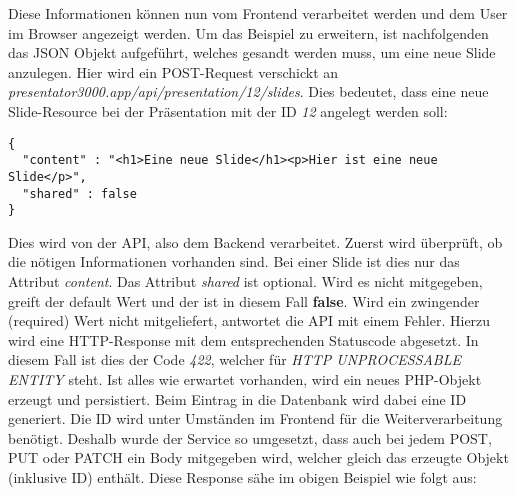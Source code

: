 Diese Informationen können nun vom Frontend verarbeitet werden und dem User im Browser angezeigt werden. Um das Beispiel zu erweitern, ist nachfolgenden das JSON Objekt aufgeführt, welches gesandt werden muss, um eine neue Slide anzulegen. Hier wird ein POST-Request verschickt an \emph{presentator3000.app/api/presentation/12/slides}. Dies bedeutet, dass eine neue Slide-Resource bei der Präsentation mit der ID \emph{12} angelegt werden soll:

\begin{lstlisting}[caption=POST Request um eine neue Slide anzulegen]
{
  "content" : "<h1>Eine neue Slide</h1><p>Hier ist eine neue Slide</p>",
  "shared" : false
}
\end{lstlisting}

Dies wird von der API, also dem Backend verarbeitet. Zuerst wird überprüft, ob die nötigen Informationen vorhanden sind. Bei einer Slide ist dies nur das Attribut \emph{content}. Das Attribut \emph{shared} ist optional. Wird es nicht mitgegeben, greift der default Wert und der ist in diesem Fall \textbf{false}. Wird ein zwingender (required) Wert nicht mitgeliefert, antwortet die API mit einem Fehler. Hierzu wird eine HTTP-Response mit dem entsprechenden Statuscode abgesetzt. In diesem Fall ist dies der Code \emph{422}, welcher für \emph{HTTP UNPROCESSABLE ENTITY} steht. Ist alles wie erwartet vorhanden, wird ein neues PHP-Objekt erzeugt und persistiert. Beim Eintrag in die Datenbank wird dabei eine ID generiert. Die ID wird unter Umständen im Frontend für die Weiterverarbeitung benötigt. Deshalb wurde der Service so umgesetzt, dass auch bei jedem POST, PUT oder PATCH ein Body mitgegeben wird, welcher gleich das erzeugte Objekt (inklusive ID) enthält. Diese Response sähe im obigen Beispiel wie folgt aus:

